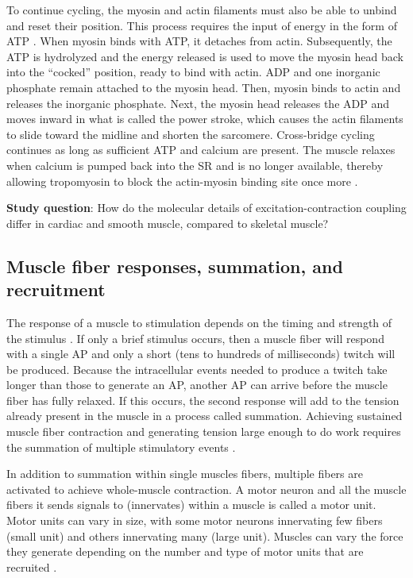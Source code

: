\documentclass{article}
\begin{document}
To continue cycling, the myosin and actin filaments must also be able to unbind and reset their position. This process requires the input of energy in the form of ATP \citep{openStax_contraction, guyton2016book}. When myosin binds with ATP, it detaches from actin. Subsequently, the ATP is hydrolyzed and the energy released is used to move the myosin head back into the ``cocked'' position, ready to bind with actin. ADP and one inorganic phosphate remain attached to the myosin head. Then, myosin binds to actin and releases the inorganic phosphate. Next, the myosin head releases the ADP and moves inward in what is called the power stroke, which causes the actin filaments to slide toward the midline and shorten the sarcomere. Cross-bridge cycling continues as long as sufficient ATP and calcium are present. The muscle relaxes when calcium is pumped back into the SR and is no longer available, thereby allowing tropomyosin to block the actin-myosin binding site once more \citep{openStax_contraction, guyton2016book}.

\textbf{Study question}: How do the molecular details of excitation-contraction coupling differ in cardiac and smooth muscle, compared to skeletal muscle?

\subsection{Muscle fiber responses, summation, and recruitment}

The response of a muscle to stimulation depends on the timing and strength of the stimulus \citep{schneider2012skeletal, openStax_neuro}. If only a brief stimulus occurs, then a muscle fiber will respond with a single AP and only a short (tens to hundreds of milliseconds) twitch will be produced. Because the intracellular events needed to produce a twitch take longer than those to generate an AP, another AP can arrive before the muscle fiber has fully relaxed. If this occurs, the second response will add to the tension already present in the muscle in a process called summation. Achieving sustained muscle fiber contraction and generating tension large enough to do work requires the summation of multiple stimulatory events \citep{schneider2012skeletal, guyton2016book}.

In addition to summation within single muscles fibers, multiple fibers are activated to achieve whole-muscle contraction. A motor neuron and all the muscle fibers it sends signals to (innervates) within a muscle is called a motor unit. Motor units can vary in size, with some motor neurons innervating few fibers (small unit) and others innervating many (large unit). Muscles can vary the force they generate depending on the number and type of motor units that are recruited \citep{openStax_neuro}.
\end{document}
